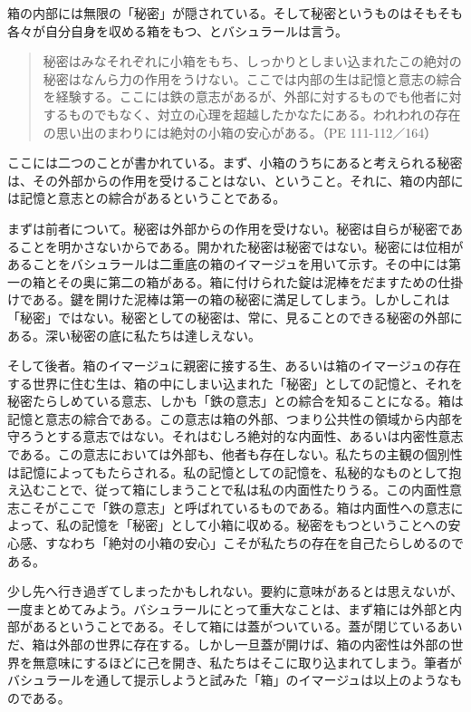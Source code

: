 \documentclass[b5j,twoside,twocolumn]{utarticle}
\begin{document}
箱の内部には無限の「秘密」が隠されている。そして秘密というものはそもそも各々が自分自身を収める箱をもつ、とバシュラールは言う。
\begin{quote}
秘密はみなそれぞれに小箱をもち、しっかりとしまい込まれたこの絶対の秘密はなんら力の作用をうけない。ここでは内部の生は記憶と意志の綜合を経験する。ここには鉄の意志があるが、外部に対するものでも他者に対するものでもなく、対立の心理を超越したかなたにある。われわれの存在の思い出のまわりには絶対の小箱の安心がある。（PE 111-112／164）
\end{quote}
ここには二つのことが書かれている。まず、小箱のうちにあると考えられる秘密は、その外部からの作用を受けることはない、ということ。それに、箱の内部には記憶と意志との綜合があるということである。


まずは前者について。秘密は外部からの作用を受けない。秘密は自らが秘密であることを明かさないからである。開かれた秘密は秘密ではない。秘密には位相があることをバシュラールは二重底の箱のイマージュを用いて示す。その中には第一の箱とその奥に第二の箱がある。箱に付けられた錠は泥棒をだますための仕掛けである。鍵を開けた泥棒は第一の箱の秘密に満足してしまう。しかしこれは「秘密」ではない。秘密としての秘密は、常に、見ることのできる秘密の外部にある。深い秘密の底に私たちは達しえない。


そして後者。箱のイマージュに親密に接する生、あるいは箱のイマージュの存在する世界に住む生は、箱の中にしまい込まれた「秘密」としての記憶と、それを秘密たらしめている意志、しかも「鉄の意志」との綜合を知ることになる。箱は記憶と意志の綜合である。この意志は箱の外部、つまり公共性の領域から内部を守ろうとする意志ではない。それはむしろ絶対的な内面性、あるいは内密性意志である。この意志においては外部も、他者も存在しない。私たちの主観の個別性は記憶によってもたらされる。私の記憶としての記憶を、私秘的なものとして抱え込むことで、従って箱にしまうことで私は私の内面性たりうる。この内面性意志こそがここで「鉄の意志」と呼ばれているものである。箱は内面性への意志によって、私の記憶を「秘密」として小箱に収める。秘密をもつということへの安心感、すなわち「絶対の小箱の安心」こそが私たちの存在を自己たらしめるのである。


少し先へ行き過ぎてしまったかもしれない。要約に意味があるとは思えないが、一度まとめてみよう。バシュラールにとって重大なことは、まず箱には外部と内部があるということである。そして箱には蓋がついている。蓋が閉じているあいだ、箱は外部の世界に存在する。しかし一旦蓋が開けば、箱の内密性は外部の世界を無意味にするほどに己を開き、私たちはそこに取り込まれてしまう。筆者がバシュラールを通して提示しようと試みた「箱」のイマージュは以上のようなものである。
\end{document}
